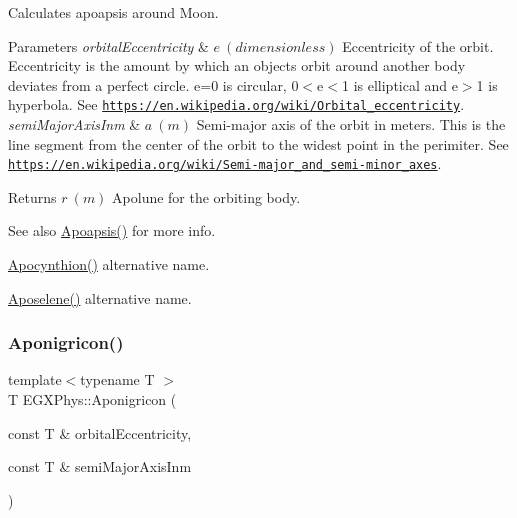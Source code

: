 Calculates apoapsis around Moon. 


\begin{DoxyParams}{Parameters}
{\em orbital\+Eccentricity} & $ e\ (dimensionless)$ Eccentricity of the orbit. Eccentricity is the amount by which an objects orbit around another body deviates from a perfect circle. e=0 is circular, 0$<$e$<$1 is elliptical and e$>$1 is hyperbola. See \href{https://en.wikipedia.org/wiki/Orbital_eccentricity}{\tt https\+://en.\+wikipedia.\+org/wiki/\+Orbital\+\_\+eccentricity}. \\
\hline
{\em semi\+Major\+Axis\+Inm} & $ a\ (m)$ Semi-\/major axis of the orbit in meters. This is the line segment from the center of the orbit to the widest point in the perimiter. See \href{https://en.wikipedia.org/wiki/Semi-major_and_semi-minor_axes}{\tt https\+://en.\+wikipedia.\+org/wiki/\+Semi-\/major\+\_\+and\+\_\+semi-\/minor\+\_\+axes}. \\
\hline
\end{DoxyParams}
\begin{DoxyReturn}{Returns}
$ r\ (m)$ Apolune for the orbiting body. 
\end{DoxyReturn}
\begin{DoxySeeAlso}{See also}
\mbox{\hyperlink{group___e_g_x_phys-_apoapsis_gafd08a2d1d64886e7bb9bcb7ff65bc3ea}{Apoapsis()}} for more info. 

\mbox{\hyperlink{group___e_g_x_phys-_apoapsis_ga44b6d3e3280b5a59e1cfb53b65673075}{Apocynthion()}} alternative name. 

\mbox{\hyperlink{group___e_g_x_phys-_apoapsis_gaf13528a3ed48f6e85f4ba5735edc1163}{Aposelene()}} alternative name. 
\end{DoxySeeAlso}
\mbox{\label{group___e_g_x_phys-_apoapsis_gabceed387c4cdd53b8ccebafe2e8da8e1}} 
\subsubsection{\texorpdfstring{Aponigricon()}{Aponigricon()}}
{\footnotesize\ttfamily template$<$typename T $>$ \\
T E\+G\+X\+Phys\+::\+Aponigricon (\begin{DoxyParamCaption}\item[{const T \&}]{orbital\+Eccentricity,  }\item[{const T \&}]{semi\+Major\+Axis\+Inm }\end{DoxyParamCaption})}



